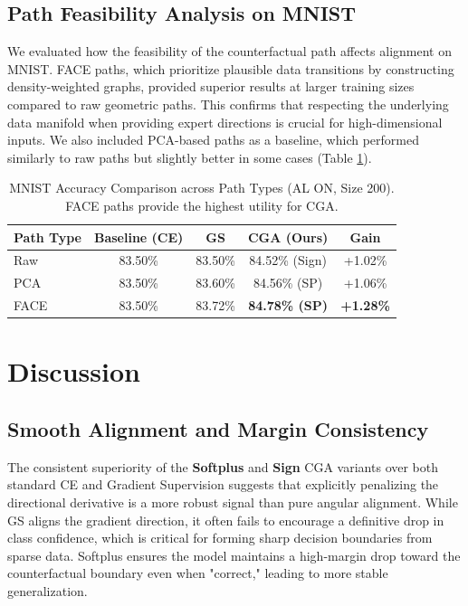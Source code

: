 \documentclass[sigconf,anonymous]{aamas}
\begin{document}
\subsection{Path Feasibility Analysis on MNIST}
We evaluated how the feasibility of the counterfactual path affects alignment on MNIST. FACE paths, which prioritize plausible data transitions by constructing density-weighted graphs, provided superior results at larger training sizes compared to raw geometric paths. This confirms that respecting the underlying data manifold when providing expert directions is crucial for high-dimensional inputs. We also included PCA-based paths as a baseline, which performed similarly to raw paths but slightly better in some cases (Table \ref{tab:mnist_paths}).

\begin{table}[h]
\centering
\caption{MNIST Accuracy Comparison across Path Types (AL ON, Size 200). FACE paths provide the highest utility for CGA.}
\label{tab:mnist_paths}
\begin{tabular}{lcccc}
\toprule
\textbf{Path Type} & \textbf{Baseline (CE)} & \textbf{GS \cite{teney2020learning}} & \textbf{CGA (Ours)} & \textbf{Gain} \\ \midrule
Raw & 83.50\% & 83.50\% & 84.52\% (Sign) & +1.02\%
 \\
PCA & 83.50\% & 83.60\% & 84.56\% (SP) & +1.06\%
 \\
FACE & 83.50\% & 83.72\% & \textbf{84.78\% (SP)} & \textbf{+1.28\%}
 \bottomrule
\end{tabular}
\end{table}

\section{Discussion}
\label{sec:discussion}

\subsection{Smooth Alignment and Margin Consistency}
The consistent superiority of the \textbf{Softplus} and \textbf{Sign} CGA variants over both standard CE and Gradient Supervision suggests that explicitly penalizing the directional derivative is a more robust signal than pure angular alignment. While GS aligns the gradient direction, it often fails to encourage a definitive drop in class confidence, which is critical for forming sharp decision boundaries from sparse data. Softplus ensures the model maintains a high-margin drop toward the counterfactual boundary even when "correct," leading to more stable generalization.
\end{document}
